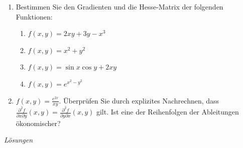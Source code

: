 \clearpage
\begin{ueb}
	{}{}
	\begin{enumerate}
		\item Bestimmen Sie den Gradienten und die Hesse-Matrix der folgenden Funktionen:
		      \begin{enumerate}
			      \item \(f(x,y) = 2xy + 3y - x^3\)
			      \item \(f(x,y) = x^2 + y^2\)
			      \item \(f(x,y) = \sin x \cos y + 2xy\)
			      \item \(f(x,y) = e^{x^2 - y^2}\)
		      \end{enumerate}
		\item \(f(x,y) = \frac{e^{2x}}{xy}\). Überprüfen Sie durch explizites Nachrechnen, dass \(\frac{\partial^2 f}{\partial x \partial y}(x,y) = \frac{\partial^2 f}{\partial y \partial x}(x,y)\) gilt. Ist eine der Reihenfolgen der Ableitungen ökonomischer?
	\end{enumerate}
\end{ueb}
\clearpage
\emph{Lösungen}

